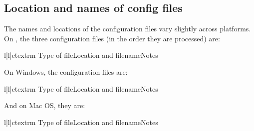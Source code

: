 \documentclass{howto}
\begin{document}
\subsection{Location and names of config files}
\label{config-filenames}

The names and locations of the configuration files vary slightly across
platforms.  On \UNIX, the three configuration files (in the order they
are processed) are:
\begin{tableiii}{l|l|c}{textrm}
  {Type of file}{Location and filename}{Notes}
\end{tableiii}

On Windows, the configuration files are:
\begin{tableiii}{l|l|c}{textrm}
  {Type of file}{Location and filename}{Notes}
\end{tableiii}

And on Mac OS, they are:
\begin{tableiii}{l|l|c}{textrm}
  {Type of file}{Location and filename}{Notes}
\end{tableiii}
\end{document}
